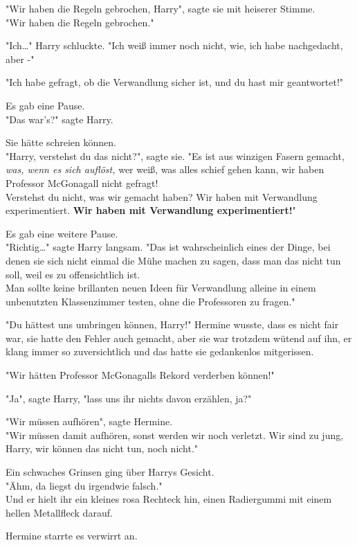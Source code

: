 {"Wir haben die Regeln gebrochen, Harry", sagte sie mit heiserer Stimme.\\ "Wir haben die Regeln gebrochen."

"Ich…" Harry schluckte. "Ich weiß immer noch nicht, wie, ich habe nachgedacht, aber -"

"Ich habe gefragt, ob die Verwandlung sicher ist, und du hast mir geantwortet!"

Es gab eine Pause.\\ "Das war's?" sagte Harry.

Sie hätte schreien können.\\ "Harry, verstehst du das nicht?", sagte sie. "Es ist aus winzigen Fasern gemacht, \emph{was, wenn es sich auflöst,} wer weiß, was alles schief gehen kann, wir haben Professor McGonagall nicht gefragt!\\ Verstehst du nicht, was wir gemacht haben? Wir haben mit Verwandlung experimentiert. \textbf{Wir haben mit Verwandlung experimentiert!}"

Es gab eine weitere Pause.\\ "Richtig…" sagte Harry langsam. "Das ist wahrscheinlich eines der Dinge, bei denen sie sich nicht einmal die Mühe machen zu sagen, dass man das nicht tun soll, weil es zu offensichtlich ist.\\ Man sollte keine brillanten neuen Ideen für Verwandlung alleine in einem unbenutzten Klassenzimmer testen, ohne die Professoren zu fragen."

"Du hättest uns umbringen können, Harry!" Hermine wusste, dass es nicht fair war, sie hatte den Fehler auch gemacht, aber sie war trotzdem wütend auf ihn, er klang immer so zuversichtlich und das hatte sie gedankenlos mitgerissen.

"Wir hätten Professor McGonagalls Rekord verderben können!"

"Ja", sagte Harry, "lass uns ihr nichts davon erzählen, ja?"

"Wir müssen aufhören", sagte Hermine.\\ "Wir müssen damit aufhören, sonst werden wir noch verletzt. Wir sind zu jung, Harry, wir können das nicht tun, noch nicht."

Ein schwaches Grinsen ging über Harrys Gesicht.\\ "Ähm, da liegst du irgendwie falsch."\\ Und er hielt ihr ein kleines rosa Rechteck hin, einen Radiergummi mit einem hellen Metallfleck darauf.

Hermine starrte es verwirrt an.

}
